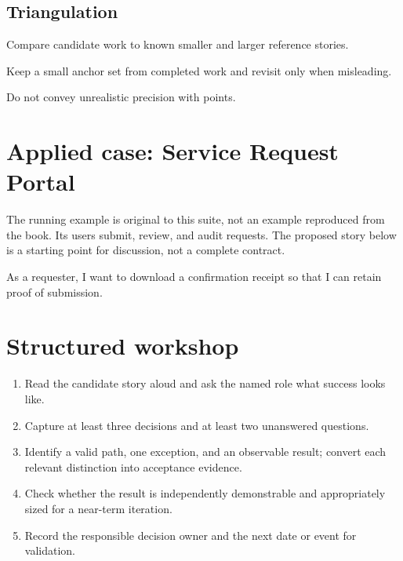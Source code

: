 \documentclass[11pt,letterpaper]{article}
\begin{document}
\subsection{Triangulation}
Compare candidate work to known smaller and larger reference stories.

\begin{tcolorbox}[colback=tealback,colframe=navy,title={Engineering translation},breakable]
Keep a small anchor set from completed work and revisit only when misleading.

\end{tcolorbox}
\begin{tcolorbox}[colback=amberback,colframe=navy,title={Failure mode to watch},breakable]
Do not convey unrealistic precision with points.

\end{tcolorbox}
\section{Applied case: Service Request Portal}
The running example is original to this suite, not an example reproduced from the book. Its users submit, review, and audit requests. The proposed story below is a starting point for discussion, not a complete contract.

\begin{tcolorbox}[colback=blueback,colframe=navy,title={Candidate story},breakable]
As a requester, I want to download a confirmation receipt so that I can retain proof of submission.

\end{tcolorbox}
\section{Structured workshop}
\begin{enumerate}[leftmargin=*,itemsep=3pt]
\item Read the candidate story aloud and ask the named role what success looks like.
\item Capture at least three decisions and at least two unanswered questions.
\item Identify a valid path, one exception, and an observable result; convert each relevant distinction into acceptance evidence.
\item Check whether the result is independently demonstrable and appropriately sized for a near-term iteration.
\item Record the responsible decision owner and the next date or event for validation.
\end{enumerate}
\end{document}
